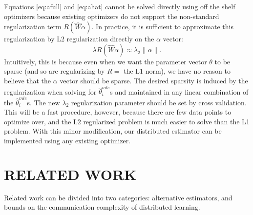 \documentclass[twoside]{article}
\newcommand{\matW}{\hat W}
\newcommand{\w}{\theta}
\newcommand{\wmle}{\hat\w^{mle}}
\newcommand{\ltwo}[1]{{\lVert {#1} \rVert}}
\begin{document}
%
Equations \ref{eq:afull} and \ref{eq:ahat} cannot be solved directly using off the shelf optimizers because existing optimizers do not support the non-standard regularization term $R(\matW\alpha)$.
In practice, it is sufficient to approximate this regularization by L2 regularization directly on the $\alpha$ vector:
\begin{equation}
\lambda R(\matW\alpha) \approx \lambda_2 \ltwo{\alpha}
.
\label{eq:approxreg}
\end{equation}
Intuitively, this is because even when we want the parameter vector $\w$ to be sparse (and so are regularizing by $R = $ the L1 norm), we have no reason to believe that the $\alpha$ vector should be sparse.
The desired sparsity is induced by the regularization when solving for $\wmle_i$s and maintained in any linear combination of the $\wmle_i$s.
The new $\lambda_2$ regularization parameter should be set by cross validation.
This will be a fast procedure, however, because there are few data points to optimize over,
and the L2 regularized problem is much easier to solve than the L1 problem.
With this minor modification, our distributed estimator can be implemented using any existing optimizer.


\section{RELATED WORK}
\label{sec:relwork}

Related work can be divided into two categories:
alternative estimators,
and bounds on the communication complexity of distributed learning.
\end{document}
